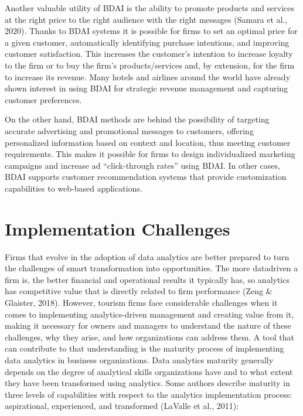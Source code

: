 \documentclass[
  letterpaper,
  DIV=11,
  numbers=noendperiod]{scrreprt}
\begin{document}
Another valuable utility of BDAI is the ability to promote products and
services at the right price to the right audience with the right
messages (Samara et al., 2020). Thanks to BDAI systems it is possible
for firms to set an optimal price for a given customer, automatically
identifying purchase intentions, and improving customer satisfaction.
This increases the customer's intention to increase loyalty to the firm
or to buy the firm's products/services and, by extension, for the firm
to increase its revenue. Many hotels and airlines around the world have
already shown interest in using BDAI for strategic revenue management
and capturing customer preferences.

On the other hand, BDAI methods are behind the possibility of targeting
accurate advertising and promotional messages to customers, offering
personalized information based on context and location, thus meeting
customer requirements. This makes it possible for firms to design
individualized marketing campaigns and increase ad ``click-through
rates'' using BDAI. In other cases, BDAI supports customer
recommendation systems that provide customization capabilities to
web-based applications.

\hypertarget{implementation-challenges}{%
\section{Implementation Challenges}\label{implementation-challenges}}

Firms that evolve in the adoption of data analytics are better prepared
to turn the challenges of smart transformation into opportunities. The
more datadriven a firm is, the better financial and operational results
it typically has, so analytics has competitive value that is directly
related to firm performance (Zeng \& Glaister, 2018). However, tourism
firms face considerable challenges when it comes to implementing
analytics-driven management and creating value from it, making it
necessary for owners and managers to understand the nature of these
challenges, why they arise, and how organizations can address them. A
tool that can contribute to that understanding is the maturity process
of implementing data analytics in business organizations. Data analytics
maturity generally depends on the degree of analytical skills
organizations have and to what extent they have been transformed using
analytics. Some authors describe maturity in three levels of
capabilities with respect to the analytics implementation process:
aspirational, experienced, and transformed (LaValle et al., 2011):
\end{document}
